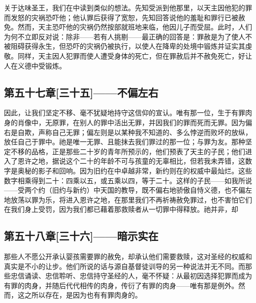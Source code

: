 关于达味圣王，我们在中读到类似的想法。先知受派到他那里，以天主因他犯的罪而发怒的灾祸恐吓他；他认罪后获得了宽恕，先知回答说他的羞耻和罪行已被赦免。然而，天主恐吓他的灾祸仍然按部就班地来临，他因儿子而受屈。此时，人们为何不立即反对说：除非——若有人挑剔——最正确的回答是：罪赦是为了使人不被阻碍获得永生，但恐吓的灾祸仍被执行，以使人在降卑的处境中锻炼并证实其虔敬。同样，天主因人犯罪而使人遭受身体的死亡，但在罪赦后并不赦免死亡，好让人在义德中受锻炼。\par


\subsection{第五十七章[三十五]——不偏左右}

因此，让我们坚定不移、毫不犹疑地持守这信仰的宣认。唯有那一位，生于有罪肉身的肖像中，无原罪，在别人的罪中活出无罪，并因我们的罪而死而无罪。因为偏右是自欺，声称自己无罪；偏左则是以某种我不知道的、多么悖逆而败坏的放纵，放任自己于罪中。祂是唯一无罪、且能抹去我们罪过的那一位；与罪为友。那种坚定不移的品格，正是那些二十岁的青年所预示的，他们预表了天主的子民；他们进入了恩许之地，据说这个二十的年龄不可与孩童的无辜相比，但若我未弄错，这数字是奥秘的影子和回响。因为旧约在中卓越非常，新约则在的权威中最灿烂。这些数字相乘得到二十：四乘以五，或五乘以四，等于二十。这样的子民——如我所说——受两个约（旧约与新约）中天国的教导，既不偏右地骄傲自恃义德，也不偏左地放荡以罪为乐，将进入恩许之地，在那里我们不再祈祷赦免罪过，也不害怕它们在我们身上受罚，因为我们都已藉着那救赎者从一切罪中得释放。祂并非，却\par


\subsection{第五十八章[三十六]——暗示实在}

那些人不愿公开承认婴孩需要罪的赦免，却承认他们需要救赎，这对圣经的权威和真实是不小的让步。他们所说的话与源自基督徒训导的另一种说法并无不同。而那些忠信诵读、忠信聆听、忠信持守圣经的人，毫不怀疑：从最初因选择犯罪而成为有罪的肉身，并随后代代相传的肉身，传衍了有罪的肉身——唯有那是例外。然而，这之所以存在，是因为也有有罪肉身的。\par

